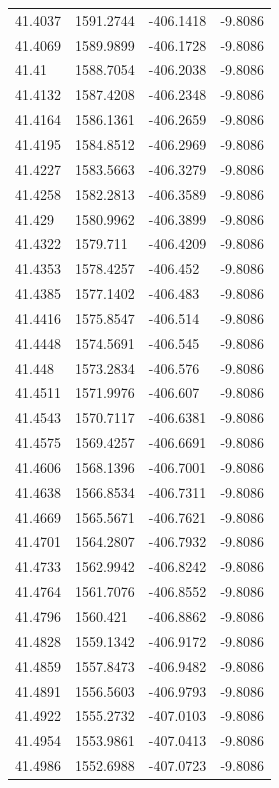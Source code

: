 \begin{table}[H]
\begin{tabular}{llll}
41.4037 & 1591.2744 & -406.1418 & -9.8086 \\
41.4069 & 1589.9899 & -406.1728 & -9.8086 \\
41.41 & 1588.7054 & -406.2038 & -9.8086 \\
41.4132 & 1587.4208 & -406.2348 & -9.8086 \\
41.4164 & 1586.1361 & -406.2659 & -9.8086 \\
41.4195 & 1584.8512 & -406.2969 & -9.8086 \\
41.4227 & 1583.5663 & -406.3279 & -9.8086 \\
41.4258 & 1582.2813 & -406.3589 & -9.8086 \\
41.429 & 1580.9962 & -406.3899 & -9.8086 \\
41.4322 & 1579.711 & -406.4209 & -9.8086 \\
41.4353 & 1578.4257 & -406.452 & -9.8086 \\
41.4385 & 1577.1402 & -406.483 & -9.8086 \\
41.4416 & 1575.8547 & -406.514 & -9.8086 \\
41.4448 & 1574.5691 & -406.545 & -9.8086 \\
41.448 & 1573.2834 & -406.576 & -9.8086 \\
41.4511 & 1571.9976 & -406.607 & -9.8086 \\
41.4543 & 1570.7117 & -406.6381 & -9.8086 \\
41.4575 & 1569.4257 & -406.6691 & -9.8086 \\
41.4606 & 1568.1396 & -406.7001 & -9.8086 \\
41.4638 & 1566.8534 & -406.7311 & -9.8086 \\
41.4669 & 1565.5671 & -406.7621 & -9.8086 \\
41.4701 & 1564.2807 & -406.7932 & -9.8086 \\
41.4733 & 1562.9942 & -406.8242 & -9.8086 \\
41.4764 & 1561.7076 & -406.8552 & -9.8086 \\
41.4796 & 1560.421 & -406.8862 & -9.8086 \\
41.4828 & 1559.1342 & -406.9172 & -9.8086 \\
41.4859 & 1557.8473 & -406.9482 & -9.8086 \\
41.4891 & 1556.5603 & -406.9793 & -9.8086 \\
41.4922 & 1555.2732 & -407.0103 & -9.8086 \\
41.4954 & 1553.9861 & -407.0413 & -9.8086 \\
41.4986 & 1552.6988 & -407.0723 & -9.8086 \\

\end{tabular}
\end{table}
